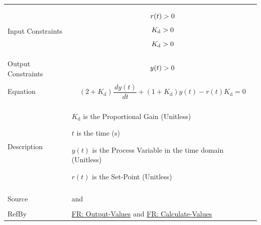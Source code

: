 \documentclass[12pt]{article}
\newcommand{\gt}{\ensuremath >}
\begin{document}
\begin{minipage}{\textwidth}
\begin{tabular}{>{\raggedright}p{}>{\raggedright\arraybackslash}p{}}
\\ \midrule \\
Input Constraints & \begin{displaymath}
                    r(t)\gt{}0
                    \end{displaymath}
                    \begin{displaymath}
                    {K_{\text{d}}}\gt{}0
                    \end{displaymath}
                    \begin{displaymath}
                    {K_{\text{d}}}\gt{}0
                    \end{displaymath}
\\ \midrule \\
Output Constraints & \begin{displaymath}
                     y(t)\gt{}0
                     \end{displaymath}
\\ \midrule \\
Equation & \begin{displaymath}
           \left(2+{K_{\text{d}}}\right) \frac{\,dy(t)}{\,dt}+\left(1+{K_{\text{d}}}\right) y(t)-r(t) {K_{\text{d}}}=0
           \end{displaymath}
\\ \midrule \\
Description & \begin{symbDescription}
              \item{${K_{\text{d}}}$ is the Proportional Gain (Unitless)}
              \item{$t$ is the time (${\text{s}}$)}
              \item{$y(t)$ is the Process Variable in the time domain (Unitless)}
              \item{$r(t)$ is the Set-Point (Unitless)}
              \end{symbDescription}
\\ \midrule \\
Source & \cite{abbasi2015} and \cite{johnson2008}
         
\\ \midrule \\
RefBy & \hyperref[outputValues]{FR: Output-Values} and \hyperref[calculateValues]{FR: Calculate-Values}
        
\\ \bottomrule
\end{tabular}
\end{minipage}
\end{document}
